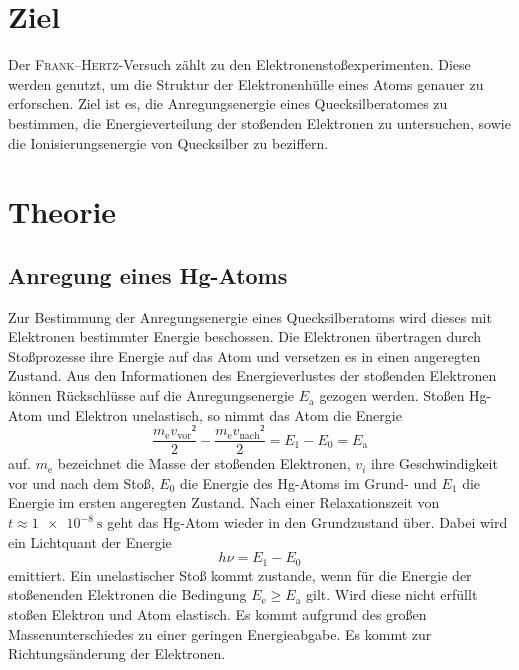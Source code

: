 \section{Ziel}
\label{sec:Ziel}
Der \textsc{Frank}--\textsc{Hertz}-Versuch zählt zu den Elektronenstoßexperimenten. 
Diese werden genutzt, um die Struktur der Elektronenhülle eines Atoms genauer zu erforschen.
Ziel ist es, die Anregungsenergie eines Quecksilberatomes zu bestimmen, die Energieverteilung der stoßenden Elektronen zu untersuchen, sowie die Ionisierungsenergie von Quecksilber zu beziffern.

\section{Theorie}
\label{sec:Theorie}
\subsection{Anregung eines Hg-Atoms}
Zur Bestimmung der Anregungsenergie eines Quecksilberatoms wird dieses mit Elektronen bestimmter Energie beschossen.
Die Elektronen übertragen durch Stoßprozesse ihre Energie auf das Atom und versetzen es in einen angeregten Zustand.
Aus den Informationen des Energieverlustes der stoßenden Elektronen können Rückschlüsse auf die Anregungsenergie $E_\mathup{a}$ gezogen werden. 
Stoßen Hg-Atom und Elektron unelastisch, so nimmt das Atom die Energie
\begin{equation}
	\label{eq:E_a}
	\frac{m_\mathup{e} v_\mathup{vor}²}{2}-\frac{m_\mathup{e} 	v_\mathup{nach}²}{2}=E_1-E_0=E_\mathup{a}
\end{equation}
auf.
$m_\mathup{e}$ bezeichnet die Masse der stoßenden Elektronen, $v_i$ ihre Geschwindigkeit vor und nach dem Stoß, $E_0$ die Energie des Hg-Atoms im Grund- und $E_1$ die Energie im ersten angeregten Zustand. 
Nach einer Relaxationszeit von $t \approx \SI{1e-8}{\second}$ geht das Hg-Atom wieder in den Grundzustand über. Dabei wird ein Lichtquant der Energie
\begin{equation}
	h \nu =E_1-E_0
\end{equation}
emittiert.
Ein unelastischer Stoß kommt zustande, wenn für die Energie der stoßenenden Elektronen die Bedingung $E_\mathup{e} \geq E_\mathup{a}$ gilt. 
Wird diese nicht erfüllt stoßen Elektron und Atom elastisch. 
Es kommt aufgrund des großen Massenunterschiedes zu einer geringen Energieabgabe.
Es kommt zur Richtungsänderung der Elektronen.

